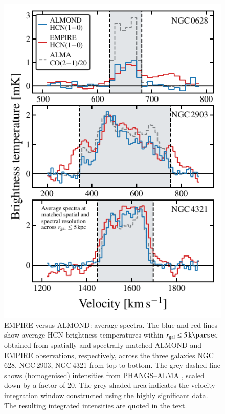\documentclass[letter, longauth]{aa} %
\begin{document}
\begin{appendix}
\begin{figure}
\centering
\includegraphics[width=\columnwidth]{Figures/ALMOND_vs_EMPIRE_spectra_compressed.pdf}
\caption{EMPIRE versus ALMOND: \hcnone average spectra.
The blue and red lines show average HCN brightness temperatures within $\rgal\leq\SI{5}{\kilo\parsec}$ obtained from spatially and spectrally matched ALMOND and EMPIRE observations, respectively, across the three galaxies NGC\,628, NGC\,2903, NGC\,4321 from top to bottom.
The grey dashed line shows (homogenised) \cotwo intensities from PHANGS--ALMA \citep{Leroy2021b}, scaled down by a factor of 20.
The grey-shaded area indicates the velocity-integration window constructed using the highly significant \cotwo data.
The resulting integrated intensities are quoted in the text.
}
\label{fig:empire_vs_almond_spectra}
\end{figure}


\end{appendix}
\end{document}
